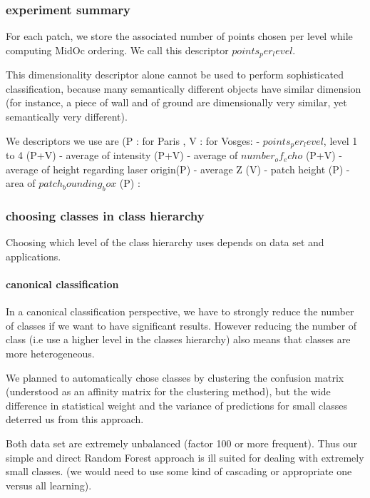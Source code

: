 		\subsubsection{experiment summary}
			For each patch, we store the associated number of points chosen per level while computing MidOc ordering. We call this descriptor $points_per_level$.
			
			This dimensionality descriptor alone cannot be used to perform sophisticated classification, because many semantically different objects have similar dimension (for instance, a piece of wall and of ground are dimensionally very similar, yet semantically very different).
						
			We descriptors we use are (P : for Paris , V : for Vosges: 
			  - $points_per_level$, level 1 to 4 (P+V)
			  - average of intensity (P+V)
			  - average of $number_of_echo$ (P+V)
			  - average of height regarding laser origin(P)
			  - average Z (V)
			  - patch height (P)
			  - area of $patch_bounding_box$ (P) : 
			 
		\subsubsection{choosing classes in class hierarchy}
			Choosing which level of the class hierarchy uses depends on data set and applications.
			
			\paragraph{canonical classification}
			
				In a canonical classification perspective, we have to strongly reduce the number of classes if we want to have significant results.
				However reducing the number of class (i.e use a higher level in the classes hierarchy) also means that classes are more heterogeneous.
				
				We planned to automatically chose classes by clustering the confusion matrix (understood as an affinity matrix for the clustering method), but the wide difference in statistical weight and the variance of predictions for small classes deterred us from this approach.
				
				Both data set are extremely unbalanced (factor 100 or more frequent). Thus our simple and direct Random Forest approach is ill suited for dealing with extremely small classes. (we would need to use some kind of cascading or appropriate one versus all learning).
				
